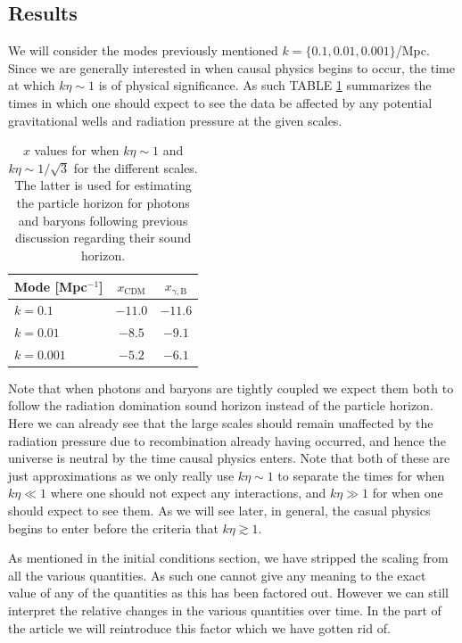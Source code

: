 \documentclass[%
reprint,
 amsmath,amssymb,
 aps,
]{revtex4-2}
\begin{document}
\subsection{Results}
We will consider the modes previously mentioned $k=\{0.1,0.01,0.001\}$/Mpc. Since we are generally interested in when causal physics begins to occur, the time at which $k\eta\sim1$ is of physical significance. As such TABLE \ref{tab:ketasim1} summarizes the times in which one should expect to see the data be affected by any potential gravitational wells and radiation pressure at the given scales.
\renewcommand{\arraystretch}{1.25}
\begin{table}[ht!]
	\caption{$x$ values for when $k\eta\sim1$ and $k\eta\sim1/\sqrt{3}$ for the different scales. The latter is used for estimating the particle horizon for photons and baryons following previous discussion regarding their sound horizon.}
	\label{tab:ketasim1}
	\begin{tabular}{|l|c|c|}
		\hline
		Mode [Mpc$^{-1}$] & $x_\text{CDM}$ & $x_{\gamma,\text{B}}$      \\\hline
		$k=0.1$                     & $-11.0$ & $-11.6$ \\\hline
		$k=0.01$                   & $-8.5$   & $-9.1$   \\\hline
		$k=0.001$                 & $-5.2$   & $-6.1$   \\\hline
	\end{tabular}
\end{table}
Note that when photons and baryons are tightly coupled we expect them both to follow the radiation domination sound horizon instead of the particle horizon. Here we can already see that the large scales should remain unaffected by the radiation pressure due to recombination already having occurred, and hence the universe is neutral by the time causal physics enters. Note that both of these are just approximations as we only really use $k\eta\sim1$ to separate the times for when $k\eta\ll1$ where one should not expect any interactions, and $k\eta\gg1$ for when one should expect to see them. As we will see later, in general, the casual physics begins to enter before the criteria that $k\eta\gtrsim1$. 

As mentioned in the initial conditions section, we have stripped the scaling from all the various quantities. As such one cannot give any meaning to the exact value of any of the quantities as this has been factored out. However we can still interpret the relative changes in the various quantities over time. In the part of the article we will reintroduce this factor which we have gotten rid of.
\end{document}
